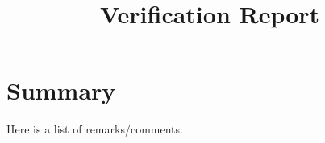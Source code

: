 \documentclass{amsart}
\title{Verification Report}
\author{}
\date{}
\begin{document}
\maketitle

\section*{Summary}


\bigskip
\noindent Here is a list of remarks/comments.\bigskip

\end{document}
